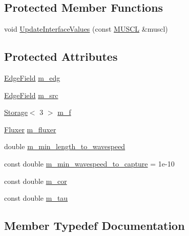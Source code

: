 \subsection*{Protected Member Functions}
\begin{DoxyCompactItemize}
\item 
void \hyperlink{structSpaceDisc_aeb63d95bb23cf1c008b7a66e65be4e7f}{Update\+Interface\+Values} (const \hyperlink{structMUSCLObject_1_1MUSCL}{M\+U\+S\+CL} \&muscl)
\end{DoxyCompactItemize}
\subsection*{Protected Attributes}
\begin{DoxyCompactItemize}
\item 
\hyperlink{ValueField_8h_afe95c3cf57931e46528822035916f101}{Edge\+Field} \hyperlink{structSpaceDisc_a7e9d515b773fc6ab168329a928d72a67}{m\+\_\+edg}
\item 
\hyperlink{ValueField_8h_afe95c3cf57931e46528822035916f101}{Edge\+Field} \hyperlink{structSpaceDisc_a31d451e05cdd7c4378279bf87c08c4fa}{m\+\_\+src}
\item 
\hyperlink{Includes_8h_ae7d375db701e28425a3faea2827f134b}{Storage}$<$ 3 $>$ \hyperlink{structSpaceDisc_ac487047c4daffb7e3f4073898df346a3}{m\+\_\+f}
\item 
\hyperlink{structSpaceDisc_a96fbebf5dd4659e2dcc144a5debc861d}{Fluxer} \hyperlink{structSpaceDisc_aebc37aeb495c6f0982adb243c5746454}{m\+\_\+fluxer}
\item 
double \hyperlink{structSpaceDisc_ae49a845e8fa56af00601cbb4333917eb}{m\+\_\+min\+\_\+length\+\_\+to\+\_\+wavespeed}
\item 
const double \hyperlink{structSpaceDisc_a1951aa057a9226abb36b3c183cf5434b}{m\+\_\+min\+\_\+wavespeed\+\_\+to\+\_\+capture} = 1e-\/10
\item 
const double \hyperlink{structSpaceDisc_a64789d9c4477009dc62c6c5b062d97c9}{m\+\_\+cor}
\item 
const double \hyperlink{structSpaceDisc_a3caf9e3638808eaf891f1ecf7299504a}{m\+\_\+tau}
\end{DoxyCompactItemize}


\subsection{Member Typedef Documentation}
\mbox{\label{structSpaceDisc_a96fbebf5dd4659e2dcc144a5debc861d}} 
